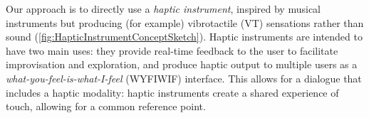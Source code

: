Our approach is to directly use a \emph{haptic instrument}, inspired by musical instruments but producing (for example) vibrotactile (VT) sensations rather than sound (\autoref{fig:HapticInstrumentConceptSketch}).
Haptic instruments are intended to have two main uses: they provide real-time feedback to the user to facilitate improvisation and exploration, and produce haptic output to multiple users as a \emph{what-you-feel-is-what-I-feel} (WYFIWIF) interface.
This allows for a dialogue that includes a haptic modality: haptic instruments create a shared experience of touch, allowing for a common reference point.






